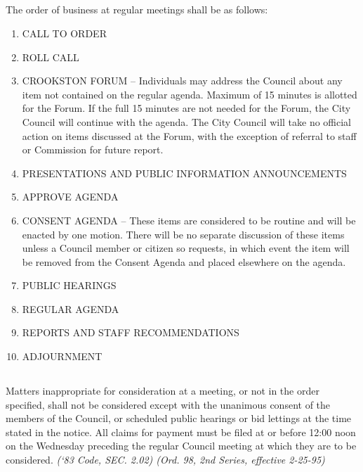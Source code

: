 \subsection{}
The order of business at regular meetings shall be as follows:
\begin{enumerate}
    \item CALL TO ORDER
    \item ROLL CALL
    \item CROOKSTON FORUM -- Individuals may address the Council about any item not contained on the regular agenda.   Maximum of 15 minutes is allotted for the Forum.  If the full 15 minutes are not needed for the Forum, the City Council will continue with the agenda.  The City Council will take no official action on items discussed at the Forum, with the exception of referral to staff or Commission for future report.
    \item PRESENTATIONS AND PUBLIC INFORMATION ANNOUNCEMENTS
    \item APPROVE AGENDA
    \item CONSENT AGENDA -- These items are considered to be routine and will be enacted by one motion.  There will be no separate discussion of these items unless a Council member or citizen so requests, in which event the item will be removed from the Consent Agenda and placed elsewhere on the agenda.
    \item PUBLIC HEARINGS
    \item REGULAR AGENDA
    \item REPORTS AND STAFF RECOMMENDATIONS
    \item ADJOURNMENT
\end{enumerate}
\subsection{}
Matters inappropriate for consideration at a meeting, or not in the order specified, shall not be considered except with the unanimous consent of the members of the Council, or scheduled public hearings or bid lettings at the time stated in the notice.  All claims for payment must be filed at or before 12:00 noon on the Wednesday preceding the regular Council meeting at which they are to be considered.\newline
\emph{(‘83 Code, SEC. 2.02)  (Ord. 98, 2nd Series, effective 2-25-95)}


